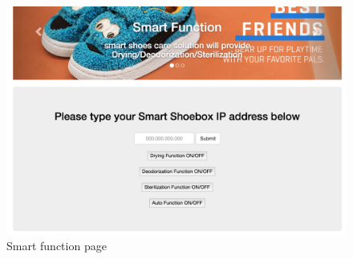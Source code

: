 \documentclass[conference]{IEEEtran}
\begin{document}
\begin{figure}[H]
\begin{center}
    \includegraphics[scale=0.25]{capture4}
    \caption{Smart function page} \label{fig:label}
\end{center}
\end{figure}
\end{document}

